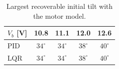 \begin{table}[h]
\centering
\caption{Largest recoverable initial tilt with the motor model.}
\label{tab:roa}
\begin{tabular}{@{}lcccc@{}}
\toprule
$V_b$ [V] & 10.8 & 11.1 & 12.0 & 12.6 \\
\midrule
PID & $34^\circ$ & $34^\circ$ & $38^\circ$ & $40^\circ$ \\
LQR & $34^\circ$ & $34^\circ$ & $38^\circ$ & $40^\circ$ \\
\bottomrule
\end{tabular}
\end{table}
